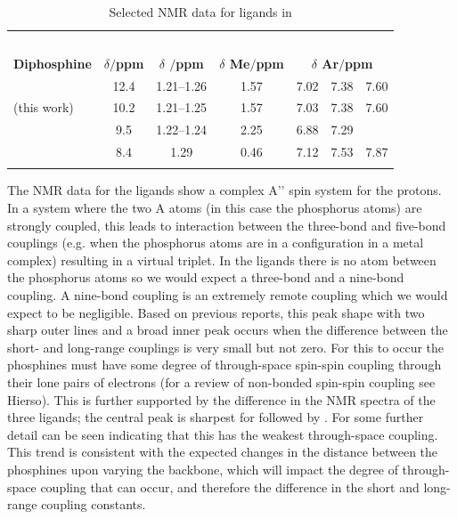 \begin{table}[ht]
\small
\caption[Selected NMR data for \tBuxantphos{} ligands]{Selected NMR data for \tBuxantphos{} ligands in }
\label{table:ligandNMRdata}
\begin{center}
\begin{tabular}{l c c c c c c}
	\toprule
	~ & \bfseries{\phosphorus} & \multicolumn{5}{c}{\bfseries{\proton}} \\
	\cmidrule(lr){2-2} \cmidrule(lr){3-7}
	\bfseries{Diphosphine} & \bfseries{$\delta/$ppm} & \bfseries{$\delta$ \ce{^{t}Bu}$/$ppm} & \bfseries{$\delta$ Me$/$ppm} & \multicolumn{3}{c}{\bfseries{$\delta$ Ar$/$ppm}} \\
	\midrule
	\tBuXantphos\cite{Mispelaere2005}	& 12.4 & 1.21--1.26 & 1.57 & 7.02 & 7.38 & 7.60 \\
	\tBuXantphos{} (this work) 		& 10.2 & 1.21--1.25 & 1.57 & 7.03 & 7.38 & 7.60 \\
	\tBuThixantphos				& 9.5 & 1.22--1.24 & 2.25 & 6.88 & 7.29 & \\
	\tBuSixantphos					& 8.4 & 1.29 & 0.46 & 7.12 & 7.53 & 7.87\\ 
	\bottomrule{}
\end{tabular}
\end{center}
\end{table}

The \proton{} NMR data for the \tBuxantphos{} ligands show a complex A'' spin system for the \tBu{} protons. In a system where the two A atoms (in this case the phosphorus atoms) are strongly coupled, this leads to interaction between the three-bond and five-bond couplings (e.g. when the phosphorus atoms are in a \trans{} configuration in a metal complex) resulting in a virtual triplet.\cite{Harris1964}  In the \tBuxantphos{} ligands there is no atom between the phosphorus atoms so we would expect a three-bond and a nine-bond coupling.  A nine-bond coupling is an extremely remote coupling which we would expect to be negligible.  Based on previous reports,\cite{Harris1964, Abraham1961} this peak shape with two sharp outer lines and a broad inner peak occurs when the difference between the short- and long-range couplings is very small but not zero.  For this to occur the phosphines must have some degree of through-space spin-spin coupling through their lone pairs of electrons (for a review of non-bonded spin-spin coupling see Hierso\cite{Hierso2014}).  This is further supported by the difference in the \proton{} NMR spectra of the three ligands; the central peak is sharpest for \tBusixantphos{} followed by \tButhixantphos{}.  For \tBuxantphos{} some further detail can be seen indicating that this has the weakest through-space coupling.  This trend is consistent with the expected changes in the distance between the phosphines upon varying the backbone, which will impact the degree of through-space coupling that can occur, and therefore the difference in the short and long-range coupling constants.

